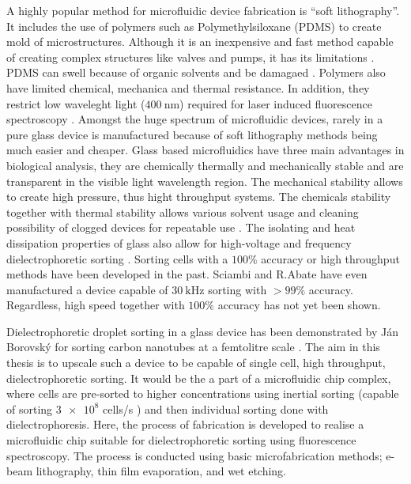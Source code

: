 \documentclass[final]{jyflluk}
\begin{document}
A highly popular method for microfluidic device fabrication is “soft lithography”. It includes the use of polymers such as Polymethylsiloxane (PDMS) to create mold of microstructures. Although it is an inexpensive and fast method capable of creating complex structures like valves and pumps, it has its limitations \cite{xia_soft_1998,tian_introduction_2009, pethig_review_2010, grover_monolithic_2003}. PDMS can swell because of organic solvents and be damagaed \cite{lee_solvent_2003}. Polymers also have limited chemical, mechanica and thermal resistance. In addition, they restrict low waveleght light ($\SI{400}{\nano \metre}$) required for laser induced fluorescence spectroscopy \cite{tian_introduction_2009,stankova_optical_2016}. Amongst the huge spectrum of microfluidic devices, rarely in a pure glass device is manufactured because of soft lithography methods being much easier and cheaper. Glass based microfluidics have three main advantages in biological analysis, they are chemically thermally and mechanically stable and are transparent in the visible light wavelength region. The mechanical stability allows to create high pressure, thus hight throughput systems. The chemicals stability together with thermal stability allows various solvent usage and cleaning possibility of clogged devices for repeatable use \cite{ofner_high-throughput_2017}. The isolating and heat dissipation properties of glass also allow for high-voltage and frequency dielectrophoretic sorting \cite{effenhauser_high-speed_1994}.
Sorting cells with a $100 \percent$ accuracy \cite{takahashi_non-destructive_2004, thomas_imagebased_2019} or high throughput methods \cite{zhang_towards_2015} have been developed in the past. Sciambi and R.Abate have even manufactured a device capable of $\SI{30}{\kilo \Hz}$ sorting with $>99 \percent$ accuracy. Regardless, high speed together with $100\percent$ accuracy has not yet been shown.

Dielectrophoretic droplet sorting in a glass device has been demonstrated by Ján Borovský for sorting carbon nanotubes at a femtolitre scale \cite{borovsky}. The aim in this thesis is to upscale such a device to be capable of single cell, high throughput, dielectrophoretic sorting. It would be the a part of a microfluidic chip complex, where cells are pre-sorted to higher concentrations using inertial sorting (capable of sorting $\num{3e8}$ cells/s \cite{edd_microfluidic_2020}) and then individual sorting done with dielectrophoresis. Here, the process of fabrication is developed to realise a microfluidic chip suitable for dielectrophoretic sorting using fluorescence spectroscopy. The process is conducted using basic microfabrication methods; e-beam lithography, thin film evaporation, and wet etching.
\end{document}
